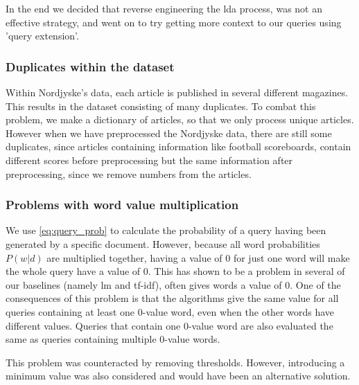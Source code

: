 In the end we decided that reverse engineering the \gls{lda} process, was not an effective strategy, and went on to try getting more context to our queries using 'query extension'.


\subsubsection{Duplicates within the dataset}
Within Nordjyske's data, each article is published in several different magazines. 
This results in the dataset consisting of many duplicates. 
To combat this problem, we make a dictionary of articles, so that we only process unique articles.
However when we have preprocessed the Nordjyske data, there are still some duplicates, since articles containing information like football scoreboards, contain different scores before preprocessing but the same information after preprocessing, since we remove numbers from the articles.


\subsubsection{Problems with word value multiplication}
We use \autoref{eq:query_prob} to calculate the probability of a query having been generated by a specific document. 
However, because all word probabilities $P(w|d)$ are multiplied together, having a value of 0 for just one word will make the whole query have a value of 0.
This has shown to be a problem in several of our baselines (namely \gls{lm} and \gls{tf-idf}), often gives words a value of 0.
One of the consequences of this problem is that the algorithms give the same value for all queries containing at least one 0-value word, even when the other words have different values. 
Queries that contain one 0-value word are also evaluated the same as queries containing multiple 0-value words.

This problem was counteracted by removing thresholds.
However, introducing a minimum value was also considered and would have been an alternative solution.
